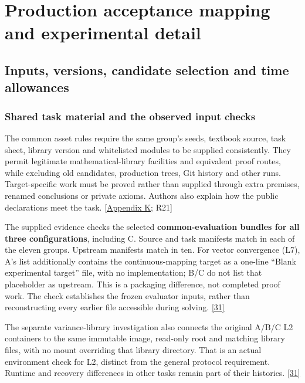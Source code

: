 \section[Production acceptance mapping and experimental detail]{\texorpdfstring{\protect\hypertarget{appendix-n}{}Production acceptance mapping and experimental detail}{Production acceptance mapping and experimental detail}}
\subsection[Inputs, versions, candidate selection and time allowances]{\texorpdfstring{\protect\hypertarget{n1}{}Inputs, versions, candidate selection and time allowances}{Inputs, versions, candidate selection and time allowances}}
\subsubsection[Shared task material and the observed input checks]{\texorpdfstring{\protect\hypertarget{n1-1}{}Shared task material and the observed input checks}{Shared task material and the observed input checks}}
The common asset rules require the same group's seeds, textbook source, task sheet, library version and whitelisted modules to be supplied consistently. They permit legitimate mathematical-library facilities and equivalent proof routes, while excluding old candidates, production trees, Git history and other runs. Target-specific work must be proved rather than supplied through extra premises, renamed conclusions or private axioms. Authors also explain how the public declarations meet the task. \hyperlink{appendix-k}{[Appendix K}; R21]

The supplied evidence checks the selected \textbf{common-evaluation bundles for all three configurations}, including C. Source and task manifests match in each of the eleven groups. Upstream manifests match in ten. For vector convergence (L7), A's list additionally contains the continuous-mapping target as a one-line “Blank experimental target” file, with no implementation; B/C do not list that placeholder as upstream. This is a packaging difference, not completed proof work. The check establishes the frozen evaluator inputs, rather than reconstructing every earlier file accessible during solving. \href{en.pdf\#ref-31}{\mbox{[31]}}

The separate variance-library investigation also connects the original A/B/C L2 containers to the same immutable image, read-only root and matching library files, with no mount overriding that library directory. That is an actual environment check for L2, distinct from the general protocol requirement. Runtime and recovery differences in other tasks remain part of their histories. \href{en.pdf\#ref-31}{\mbox{[31]}}

